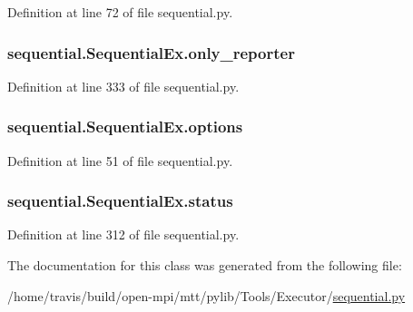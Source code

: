 Definition at line 72 of file sequential.\-py.

\hypertarget{classsequential_1_1SequentialEx_a7c81be8b211e0e01022948ce0a7d4e19}{
\subsubsection[{only\-\_\-reporter}]{\setlength{\rightskip}{0pt plus 5cm}sequential.\-Sequential\-Ex.\-only\-\_\-reporter}}\label{classsequential_1_1SequentialEx_a7c81be8b211e0e01022948ce0a7d4e19}


Definition at line 333 of file sequential.\-py.

\hypertarget{classsequential_1_1SequentialEx_a72ae94e2c46c2b1b8c5022eaf3593edf}{
\subsubsection[{options}]{\setlength{\rightskip}{0pt plus 5cm}sequential.\-Sequential\-Ex.\-options}}\label{classsequential_1_1SequentialEx_a72ae94e2c46c2b1b8c5022eaf3593edf}


Definition at line 51 of file sequential.\-py.

\hypertarget{classsequential_1_1SequentialEx_a7f8ca8932ced5d9daf6191598894eb58}{
\subsubsection[{status}]{\setlength{\rightskip}{0pt plus 5cm}sequential.\-Sequential\-Ex.\-status}}\label{classsequential_1_1SequentialEx_a7f8ca8932ced5d9daf6191598894eb58}


Definition at line 312 of file sequential.\-py.



The documentation for this class was generated from the following file\-:\begin{DoxyCompactItemize}
\item 
/home/travis/build/open-\/mpi/mtt/pylib/\-Tools/\-Executor/\hyperlink{sequential_8py}{sequential.\-py}\end{DoxyCompactItemize}
